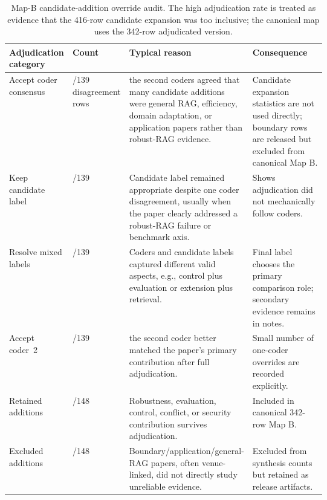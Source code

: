 \begin{table}[t]
\centering
\scriptsize
\renewcommand{\arraystretch}{0.9}
\begin{tabularx}{\linewidth}{>{\raggedright\arraybackslash}p{0.20\linewidth}>{\raggedright\arraybackslash}p{0.17\linewidth}>{\raggedright\arraybackslash}p{0.24\linewidth}X}
\toprule
\textbf{Adjudication category} & \textbf{Count} & \textbf{Typical reason} & \textbf{Consequence} \\
\midrule
Accept coder consensus & 114/139 disagreement rows & the second coders agreed that many candidate additions were general RAG, efficiency, domain adaptation, or application papers rather than robust-RAG evidence. & Candidate expansion statistics are not used directly; boundary rows are released but excluded from canonical Map B. \\
Keep candidate label & 14/139 & Candidate label remained appropriate despite one coder disagreement, usually when the paper clearly addressed a robust-RAG failure or benchmark axis. & Shows adjudication did not mechanically follow coders. \\
Resolve mixed labels & 7/139 & Coders and candidate labels captured different valid aspects, e.g., control plus evaluation or extension plus retrieval. & Final label chooses the primary comparison role; secondary evidence remains in notes. \\
Accept coder~2 & 4/139 & the second coder better matched the paper's primary contribution after full adjudication. & Small number of one-coder overrides are recorded explicitly. \\
\midrule
Retained additions & 74/148 & Robustness, evaluation, control, conflict, or security contribution survives adjudication. & Included in canonical 342-row Map B. \\
Excluded additions & 74/148 & Boundary/application/general-RAG papers, often venue-linked, did not directly study unreliable evidence. & Excluded from synthesis counts but retained as release artifacts. \\
\bottomrule
\end{tabularx}
\caption{Map-B candidate-addition override audit. The high adjudication rate is treated as evidence that the 416-row candidate expansion was too inclusive; the canonical map uses the 342-row adjudicated version.}
\label{tab:map-b-override-audit}
\end{table}

